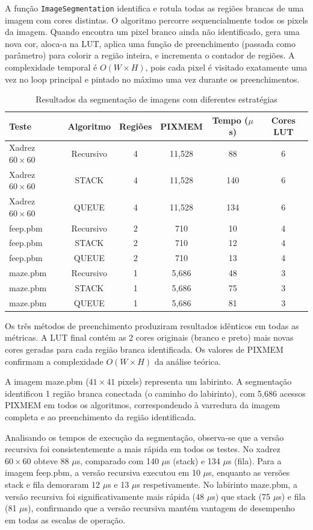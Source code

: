 \documentclass[12pt,a4paper]{article}
\begin{document}
A função \texttt{ImageSegmentation} identifica e rotula todas as regiões brancas de uma imagem com cores distintas. O algoritmo percorre sequencialmente todos os pixels da imagem. Quando encontra um pixel branco ainda não identificado, gera uma nova cor, aloca-a na LUT, aplica uma função de preenchimento (passada como parâmetro) para colorir a região inteira, e incrementa o contador de regiões. A complexidade temporal é $O(W \times H)$, pois cada pixel é visitado exatamente uma vez no loop principal e pintado no máximo uma vez durante os preenchimentos.

\begin{table}[h]
\begin{tabular}{|l|c|c|c|c|c|}
\hline
\textbf{Teste} & \textbf{Algoritmo} & \textbf{Regiões} & \textbf{PIXMEM} & \textbf{Tempo ($\mu$s)} & \textbf{Cores LUT} \\
\hline
Xadrez $60 \times 60$ & Recursivo & 4 & 11,528 & 88 & 6 \\
Xadrez $60 \times 60$ & STACK & 4 & 11,528 & 140 & 6 \\
Xadrez $60 \times 60$ & QUEUE & 4 & 11,528 & 134 & 6 \\
feep.pbm & Recursivo & 2 & 710 & 10 & 4 \\
feep.pbm & STACK & 2 & 710 & 12 & 4 \\
feep.pbm & QUEUE & 2 & 710 & 13 & 4 \\
maze.pbm & Recursivo & 1 & 5,686 & 48 & 3 \\
maze.pbm & STACK & 1 & 5,686 & 75 & 3 \\
maze.pbm & QUEUE & 1 & 5,686 & 81 & 3 \\
\hline
\end{tabular}
\caption{Resultados da segmentação de imagens com diferentes estratégias}
\end{table}

Os três métodos de preenchimento produziram resultados idênticos em todas as métricas. A LUT final contém as 2 cores originais (branco e preto) mais novas cores geradas para cada região branca identificada. Os valores de PIXMEM confirmam a complexidade $O(W \times H)$ da análise teórica.

A imagem maze.pbm ($41 \times 41$ pixels) representa um labirinto. A segmentação identificou 1 região branca conectada (o caminho do labirinto), com 5,686 acessos PIXMEM em todos os algoritmos, correspondendo à varredura da imagem completa e ao preenchimento da região identificada.

Analisando os tempos de execução da segmentação, observa-se que a versão recursiva foi consistentemente a mais rápida em todos os testes. No xadrez $60 \times 60$ obteve 88 $\mu$s, comparado com 140 $\mu$s (stack) e 134 $\mu$s (fila). Para a imagem feep.pbm, a versão recursiva executou em 10 $\mu$s, enquanto as versões stack e fila demoraram 12 $\mu$s e 13 $\mu$s respetivamente. No labirinto maze.pbm, a versão recursiva foi significativamente mais rápida (48 $\mu$s) que stack (75 $\mu$s) e fila (81 $\mu$s), confirmando que a versão recursiva mantém vantagem de desempenho em todas as escalas de operação.
\end{document}
